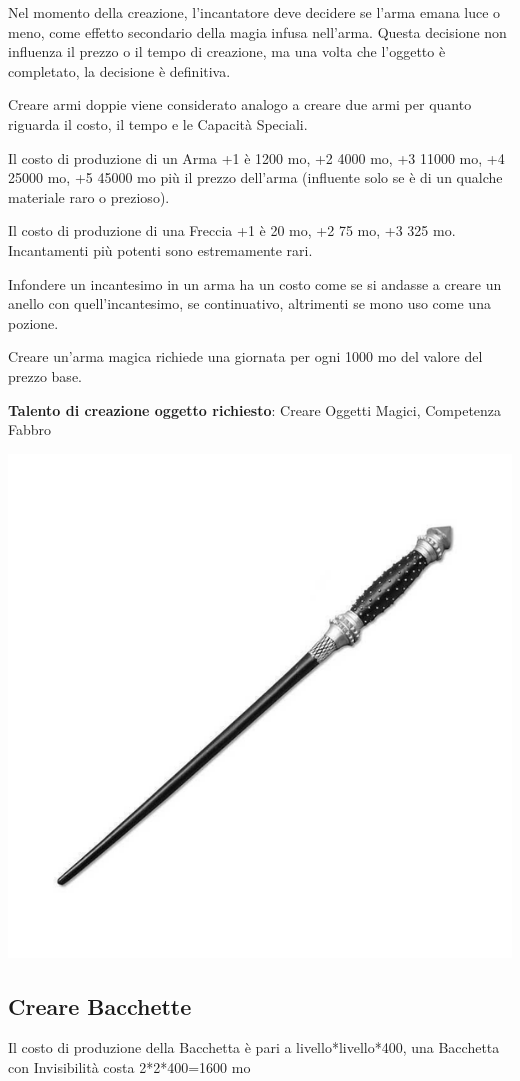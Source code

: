 \begin{multicols}{2}
Nel momento della creazione, l'incantatore deve decidere se l'arma emana luce o meno, come effetto secondario della magia infusa nell'arma. Questa decisione non influenza il prezzo o il tempo di creazione, ma una volta che l'oggetto è completato, la decisione è definitiva.

Creare armi doppie viene considerato analogo a creare due armi per quanto riguarda il costo, il tempo e le Capacità Speciali.

Il costo di produzione di un Arma +1 è 1200 mo, +2 4000 mo, +3 11000 mo, +4 25000 mo, +5 45000 mo più il prezzo dell'arma (influente solo se è di un qualche materiale raro o prezioso).

Il costo di produzione di una Freccia +1 è 20 mo, +2 75 mo, +3 325 mo. Incantamenti più potenti sono estremamente rari.

Infondere un incantesimo in un arma ha un costo come se si andasse a creare un anello con quell'incantesimo, se continuativo, altrimenti se mono uso come una pozione.

Creare un'arma magica richiede una giornata per ogni 1000 mo del valore del prezzo base.

\medskip

\textbf{Talento di creazione oggetto richiesto}: Creare Oggetti Magici, Competenza Fabbro

\begin{center}
	\includegraphics[width=0.5\linewidth]{immagini/wand.png}
\end{center}

\subsection{Creare Bacchette}\label{crearebacchette}

Il costo di produzione della Bacchetta è pari a livello*livello*400, una Bacchetta con Invisibilità costa 2*2*400=1600 mo


\end{multicols}
